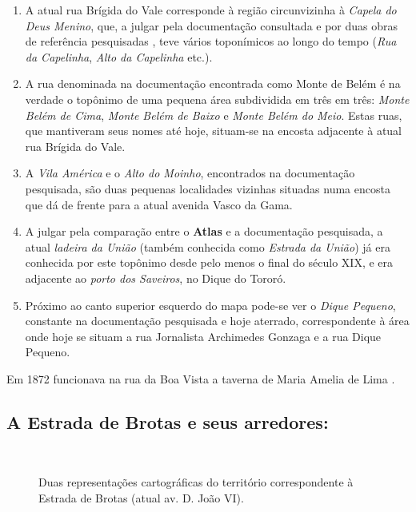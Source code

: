 \begin{enumerate}
\item A atual rua Brígida do Vale corresponde à região circunvizinha à \textit{Capela do Deus Menino}, que, a julgar pela documentação consultada e por duas obras de referência pesquisadas \cite{municipal_atlas_1955,souza_guia_1935}, teve vários toponímicos ao longo do tempo (\textit{Rua da Capelinha}, \textit{Alto da Capelinha} etc.).
\item A rua denominada na documentação encontrada como Monte de Belém é na verdade o topônimo de uma pequena área subdividida em três em três: \textit{Monte Belém de Cima}, \textit{Monte Belém de Baixo} e \textit{Monte Belém do Meio}. Estas ruas, que mantiveram seus nomes até hoje, situam-se na encosta adjacente à atual rua Brígida do Vale.
\item A \textit{Vila América} e o \textit{Alto do Moinho}, encontrados na documentação pesquisada, são duas pequenas localidades vizinhas situadas numa encosta que dá de frente para a atual avenida Vasco da Gama.
\item A julgar pela comparação entre o \textbf{Atlas} e a documentação pesquisada, a atual \textit{ladeira da União} (também conhecida como \textit{Estrada da União}) já era conhecida por este topônimo desde pelo menos o final do século XIX, e era adjacente ao \textit{porto dos Saveiros}, no Dique do Tororó.
\item Próximo ao canto superior esquerdo do mapa pode-se ver o \textit{Dique Pequeno}, constante na documentação pesquisada e hoje aterrado, correspondente à área onde hoje se situam a rua Jornalista Archimedes Gonzaga e a rua Dique Pequeno.
\end{enumerate}

Em 1872 funcionava na rua da Boa Vista a taverna de Maria Amelia de Lima \cite[terceira~parte, pp.~48]{pimenta_almanak_1872}.




\subsection{A Estrada de Brotas e seus arredores: }

\begin{figure}[!htp]
\centering
{}
\  %
\caption{Duas representações cartográficas do território correspondente à Estrada de Brotas (atual av. D. João VI).}
\end{figure}

